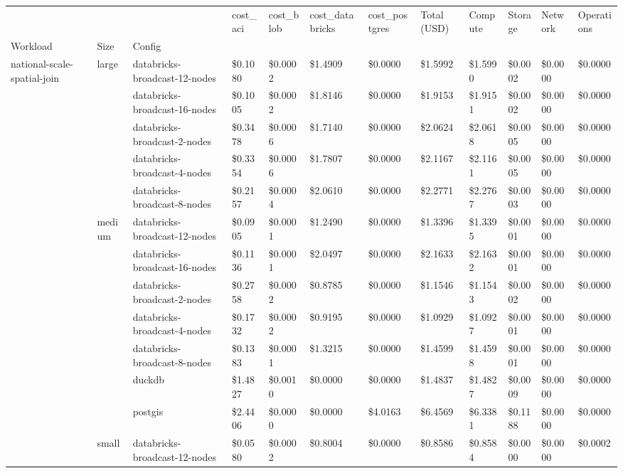 \begin{tabular}{llllllllllll}
\toprule
 &  &  & cost_aci & cost_blob & cost_databricks & cost_postgres & Total (USD) & Compute & Storage & Network & Operations \\
Workload & Size & Config &  &  &  &  &  &  &  &  &  \\
\midrule
\multirow[t]{24}{*}{national-scale-spatial-join} & \multirow[t]{5}{*}{large} & databricks-broadcast-12-nodes & \$0.1080 & \$0.0002 & \$1.4909 & \$0.0000 & \$1.5992 & \$1.5990 & \$0.0002 & \$0.0000 & \$0.0000 \\
 &  & databricks-broadcast-16-nodes & \$0.1005 & \$0.0002 & \$1.8146 & \$0.0000 & \$1.9153 & \$1.9151 & \$0.0002 & \$0.0000 & \$0.0000 \\
 &  & databricks-broadcast-2-nodes & \$0.3478 & \$0.0006 & \$1.7140 & \$0.0000 & \$2.0624 & \$2.0618 & \$0.0005 & \$0.0000 & \$0.0000 \\
 &  & databricks-broadcast-4-nodes & \$0.3354 & \$0.0006 & \$1.7807 & \$0.0000 & \$2.1167 & \$2.1161 & \$0.0005 & \$0.0000 & \$0.0000 \\
 &  & databricks-broadcast-8-nodes & \$0.2157 & \$0.0004 & \$2.0610 & \$0.0000 & \$2.2771 & \$2.2767 & \$0.0003 & \$0.0000 & \$0.0000 \\
\cline{2-12}
 & \multirow[t]{7}{*}{medium} & databricks-broadcast-12-nodes & \$0.0905 & \$0.0001 & \$1.2490 & \$0.0000 & \$1.3396 & \$1.3395 & \$0.0001 & \$0.0000 & \$0.0000 \\
 &  & databricks-broadcast-16-nodes & \$0.1136 & \$0.0001 & \$2.0497 & \$0.0000 & \$2.1633 & \$2.1632 & \$0.0001 & \$0.0000 & \$0.0000 \\
 &  & databricks-broadcast-2-nodes & \$0.2758 & \$0.0002 & \$0.8785 & \$0.0000 & \$1.1546 & \$1.1543 & \$0.0002 & \$0.0000 & \$0.0000 \\
 &  & databricks-broadcast-4-nodes & \$0.1732 & \$0.0002 & \$0.9195 & \$0.0000 & \$1.0929 & \$1.0927 & \$0.0001 & \$0.0000 & \$0.0000 \\
 &  & databricks-broadcast-8-nodes & \$0.1383 & \$0.0001 & \$1.3215 & \$0.0000 & \$1.4599 & \$1.4598 & \$0.0001 & \$0.0000 & \$0.0000 \\
 &  & duckdb & \$1.4827 & \$0.0010 & \$0.0000 & \$0.0000 & \$1.4837 & \$1.4827 & \$0.0009 & \$0.0000 & \$0.0000 \\
 &  & postgis & \$2.4406 & \$0.0000 & \$0.0000 & \$4.0163 & \$6.4569 & \$6.3381 & \$0.1188 & \$0.0000 & \$0.0000 \\
\cline{2-12}
 & \multirow[t]{12}{*}{small} & databricks-broadcast-12-nodes & \$0.0580 & \$0.0002 & \$0.8004 & \$0.0000 & \$0.8586 & \$0.8584 & \$0.0000 & \$0.0000 & \$0.0002 \\

\end{tabular}
